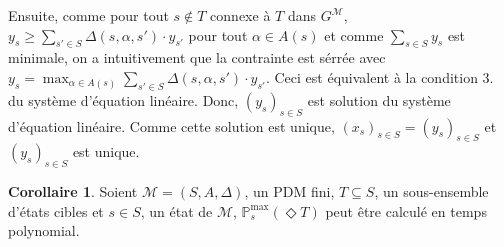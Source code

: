 \documentclass[12pt,a4paper]{report}
\theoremstyle{definition}%
\newtheorem{corollaire}{Corollaire}[chapter]
\theoremstyle{remark}
\newcommand{\pr}{\mathbb{P}}
\begin{document}
%
Ensuite, comme pour tout $s \not \in T$ connexe à $T$ dans $G^\mathcal{M}$,
$y_s \geq \sum_{s' \in S} \Delta(s, \alpha, s') \cdot y_{s'}$ pour tout $\alpha \in A(s)$ et
comme $\sum_{s \in S} y_s$ est minimale, on a intuitivement que
la contrainte est sérrée avec
$y_s = \max_{\alpha \in A(s)} \sum_{s' \in S} \Delta(s, \alpha, s') \cdot y_{s'}$. Ceci est équivalent à la condition $3.$ du système d'équation
linéaire.
	Donc, $(y_s)_{s \in S}$ est solution du système d'équation linéaire. Comme
	cette solution est unique, $(x_s)_{s \in S} = (y_s)_{s \in S}$ et $(y_s)_{s
\in S}$ est unique.

\begin{corollaire}
	Soient $\mathcal{M} = (S, A, \Delta)$, un PDM fini, $T \subseteq S$, un
	sous-ensemble d'états cibles et $s \in S$, un état de $\mathcal{M}$,
	$\pr^{\max}_s(\Diamond T)$ peut être calculé en temps polynomial.
\end{corollaire}
\end{document}
